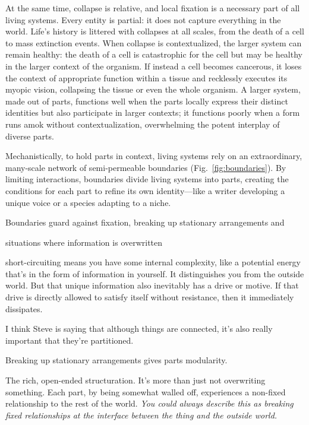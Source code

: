 \documentclass[11pt]{article}
\begin{document}
At the same time, collapse is relative, and local fixation is a necessary part of all living systems. Every entity is partial: it does not capture everything in the world. Life's history is littered with collapses at all scales, from the death of a cell to mass extinction events. When collapse is contextualized, the larger system can remain healthy: the death of a cell is catastrophic for the cell but may be healthy in the larger context of the organism. If instead a cell becomes cancerous, it loses the context of appropriate function within a tissue and recklessly executes its myopic vision, collapsing the tissue or even the whole organism. A larger system, made out of parts, functions well when the parts locally express their distinct identities but also participate in larger contexts; it functions poorly when a form runs amok without contextualization, overwhelming the potent interplay of diverse parts.

Mechanistically, to hold parts in context, living systems rely on an extraordinary, many-scale network of semi-permeable boundaries \citep{maturana2012autopoiesis, simon1962architecture, moreno2015biological} (Fig.~\ref{fig:boundaries}). By limiting interactions, boundaries divide living systems into parts, creating the conditions for each part to refine its own identity---like a writer developing a unique voice or a species adapting to a niche. 

Boundaries guard against fixation, breaking up stationary arrangements and 

situations where information is overwritten

short-circuiting means you have some internal complexity, like a potential energy that's in the form of information in yourself. It distinguishes you from the outside world. But that unique information also inevitably has a drive or motive. If that drive is directly allowed to satisfy itself without resistance, then it immediately dissipates. 

I think Steve is saying that although things are connected, it's also really important that they're partitioned. 

Breaking up stationary arrangements gives parts modularity. 

The rich, open-ended structuration. It's more than just not overwriting something. Each part, by being somewhat walled off, experiences a non-fixed relationship to the rest of the world. \textit{You could always describe this as breaking fixed relationships at the interface between the thing and the outside world.} 
\end{document}
